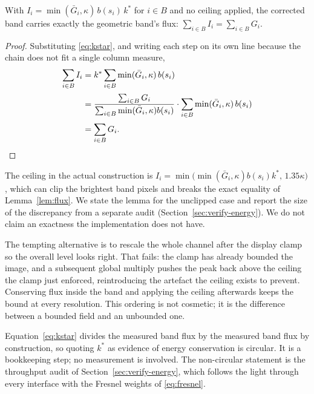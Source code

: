 \begin{lemma}
\label{lem:flux}
With $I_i = \min(\bar G_i,\kappa)\,b(s_i)\,k^{*}$ for $i \in B$ and no ceiling
applied, the corrected band carries exactly the geometric band's flux:
$\sum_{i \in B} I_i = \sum_{i \in B} G_i$.
\end{lemma}

\begin{proof}
Substituting \eqref{eq:kstar}, and writing each step on its own line because the
chain does not fit a single column measure,
\begin{equation}
\begin{split}
\sum_{i \in B} I_i
&= k^{*} \sum_{i \in B} \min(\bar G_i,\kappa)\,b(s_i) \\[2pt]
&= \frac{\sum_{i\in B} G_i}{\sum_{i\in B}\min(\bar G_i,\kappa)b(s_i)}
   \cdot \sum_{i \in B} \min(\bar G_i,\kappa)\,b(s_i) \\[2pt]
&= \sum_{i \in B} G_i . \qedhere
\end{split}
\end{equation}
\end{proof}

The ceiling in the actual construction is
$I_i = \min\big(\min(\bar G_i,\kappa)b(s_i)k^{*},\,1.35\kappa\big)$, which can
clip the brightest band pixels and breaks the exact equality of
Lemma~\ref{lem:flux}. We state the lemma for the unclipped case and report the size of the discrepancy from a separate audit (Section~\ref{sec:verify-energy}). We do not claim an exactness the implementation does not have.

The tempting alternative is to rescale the whole channel after the display clamp
so the overall level looks right. That fails: the clamp has already bounded the
image, and a subsequent global multiply pushes the peak back above the ceiling
the clamp just enforced, reintroducing the artefact the ceiling exists to
prevent. Conserving flux inside the band and applying the ceiling afterwards
keeps the bound at every resolution. This ordering is not cosmetic; it is the
difference between a bounded field and an unbounded one.

\begin{remark}
\label{rem:circular}
Equation~\eqref{eq:kstar} divides the measured band flux by the measured band
flux by construction, so quoting $k^{*}$ as evidence of energy conservation is
circular. It is a bookkeeping step; no measurement is involved. The non-circular
statement is the throughput audit of Section~\ref{sec:verify-energy}, which
follows the light through every interface with the Fresnel weights of
\eqref{eq:fresnel}.
\end{remark}

